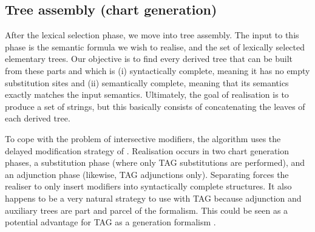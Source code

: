 \subsection{Tree assembly (chart generation)}
\label{sec:geni-chart}

After the lexical selection phase, we move into tree assembly.  The
input to this phase is the semantic formula we wish to
realise, and the set of lexically selected elementary trees.  Our
objective is to find every derived tree that can be built from these
parts and which is (i) syntactically complete, meaning it has no empty 
substitution sites and (ii) semantically complete, meaning that its
semantics exactly matches the input semantics.  Ultimately, the goal
of realisation is to produce a set of strings, but this basically
consists of concatenating the leaves of each derived tree.

To cope with the problem of intersective modifiers, the algorithm uses
the delayed modification strategy of \cite{carroll1999ecg}.  Realisation
occurs in two chart generation phases, a substitution phase (where only
TAG substitutions are performed), and an adjunction phase (likewise, TAG
adjunctions only).  Separating forces the realiser to only insert
modifiers into syntactically complete structures.  It also happens to be
a very natural strategy to use with TAG because adjunction and auxiliary
trees are part and parcel of the formalism.  This could be seen as a
potential advantage for TAG as a generation formalism
\cite{gardent2005gas}.

